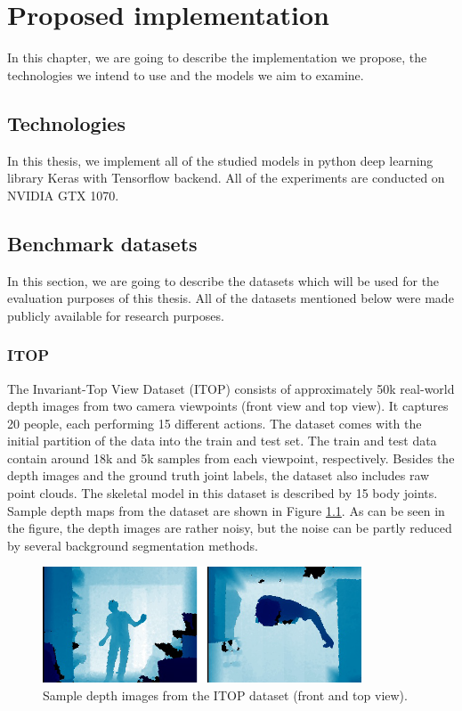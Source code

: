 \chapter{Proposed implementation}\label{chap:proposal}
In this chapter, we are going to describe the implementation we propose, the technologies we intend to use and the models we aim to examine.


\section{Technologies}
In this thesis, we implement all of the studied models in python deep learning library Keras with Tensorflow backend. All of the experiments are conducted on NVIDIA GTX 1070.

\section{Benchmark datasets}

In this section, we are going to describe the datasets which will be used for the evaluation purposes of this thesis. All of the datasets mentioned below were made publicly available for research purposes.
\subsection{ITOP}
The Invariant-Top View Dataset (ITOP) \cite{haque2016viewpoint} consists of approximately 50k real-world depth images from two camera viewpoints (front view and top view). It captures 20 people, each performing 15 different actions. The dataset comes with the initial partition of the data into the train and test set. The train and test data contain around 18k and 5k samples from each viewpoint, respectively. Besides the depth images and the ground truth joint labels, the dataset also includes raw point clouds. The skeletal model in this dataset is described by 15 body joints. Sample depth maps from the dataset are shown in Figure \ref{fig:itop}. As can be seen in the figure, the depth images are rather noisy, but the noise can be partly reduced by several background segmentation methods.\par

\vspace{5mm}
\begin{figure}[H]
\begin{center}
  \includegraphics[height=130px]{images/implementation/itop.png}
  \caption[Sample depth images from the ITOP dataset \cite{haque2016viewpoint}.]{Sample depth images from the ITOP dataset \cite{haque2016viewpoint} (front and top view).}
  \label{fig:itop}
\end{center}
\end{figure}


